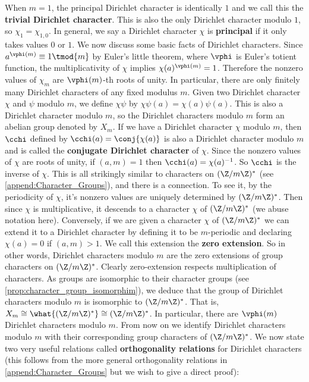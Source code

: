     When $m = 1$, the principal Dirichlet character is identically $1$ and we call this the \textbf{trivial Dirichlet character}. This is also the only Dirichlet character modulo $1$, so $\chi_{1} = \chi_{1,0}$. In general, we say a Dirichlet character $\chi$ is \textbf{principal} if it only takes values $0$ or $1$. We now discuss some basic facts of Dirichlet characters. Since $a^{\vphi(m)} \equiv 1 \tmod{m}$ by Euler's little theorem, where $\vphi$ is Euler's totient function, the multiplicativity of $\chi$ implies $\chi(a)^{\vphi(m)} = 1$. Therefore the nonzero values of $\chi_{m}$ are $\vphi(m)$-th roots of unity. In particular, there are only finitely many Dirichlet characters of any fixed modulus $m$. Given two Dirichlet character $\chi$ and $\psi$ modulo $m$, we define $\chi\psi$ by $\chi\psi(a) = \chi(a)\psi(a)$. This is also a Dirichlet character modulo $m$, so the Dirichlet characters modulo $m$ form an abelian group denoted by $X_{m}$. If we have a Dirichlet character $\chi$ modulo $m$, then $\cchi$ defined by $\cchi(a) = \conj{\chi(a)}$ is also a Dirichlet character modulo $m$ and is called the \textbf{conjugate Dirichlet character} of $\chi$. Since the nonzero values of $\chi$ are roots of unity, if $(a,m) = 1$ then $\cchi(a) = \chi(a)^{-1}$. So $\cchi$ is the inverse of $\chi$. This is all strikingly similar to characters on $(\Z/m\Z)^{\ast}$ (see \cref{append:Character_Groups}), and there is a connection. To see it, by the periodicity of $\chi$, it's nonzero values are uniquely determined by $(\Z/m\Z)^{\ast}$. Then since $\chi$ is multiplicative, it descends to a character $\chi$ of $(\Z/m\Z)^{\ast}$ (we abuse notation here). Conversely, if we are given a character $\chi$ of $(\Z/m\Z)^{\ast}$ we can extend it to a Dirichlet character by defining it to be $m$-periodic and declaring $\chi(a) = 0$ if $(a,m) > 1$. We call this extension the \textbf{zero extension}. So in other words, Dirichlet characters modulo $m$ are the zero extensions of group characters on $(\Z/m\Z)^{\ast}$. Clearly zero-extension respects multiplication of characters. As groups are isomorphic to their character groups (see \cref{prop:character_group_isomorphim}), we deduce that the group of Dirichlet characters modulo $m$ is isomorphic to $(\Z/m\Z)^{\ast}$. That is, $X_{m} \cong \what{(\Z/m\Z)^{\ast}} \cong (\Z/m\Z)^{\ast}$. In particular, there are $\vphi(m)$ Dirichlet characters modulo $m$. From now on we identify Dirichlet characters modulo $m$ with their corresponding group characters of $(\Z/m\Z)^{\ast}$. We now state two very useful relations called \textbf{orthogonality relations} for Dirichlet characters (this follows from the more general orthogonality relations in \cref{append:Character_Groups} but we wish to give a direct proof):

